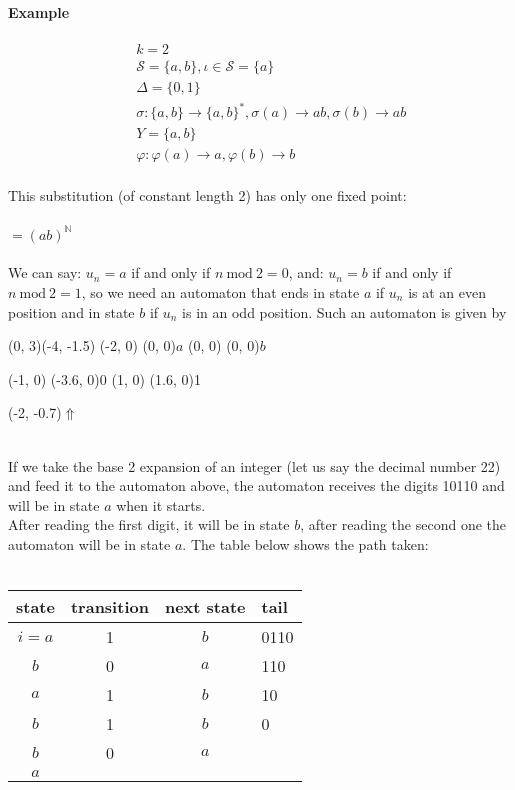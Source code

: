 \documentclass{article}
\begin{document}
\paragraph{Example}
\begin{eqnarray*}
&&k = 2\\
&&\mathcal{S} = \{a, b\}, \iota \in \mathcal{S} = \{a\}\\
&&\Delta = \{0, 1\}\\
&&\sigma:\{a, b\} \rightarrow \{a, b\}^*, \sigma(a) \rightarrow ab,
\sigma(b) \rightarrow ab\\
&&Y = \{a, b\}\\
&&\varphi: \varphi(a) \rightarrow a, \varphi(b) \rightarrow b
\end{eqnarray*}
\\
This substitution (of constant length 2) has only one fixed point:\\
\\
$= (ab)^\mathbb{N}$\\
\\
We can say: $u_n = a$ if and only if $n \mathrm{\ mod\ } 2 = 0$, and:
$u_n = b$ if and only if $n \mathrm{\ mod\ } 2 = 1$, so we need an automaton
that ends in state $a$ if $u_n$ is at an even position and in state $b$ if
$u_n$ is in an odd position. Such an automaton is given by\\
\begin{graph}(0, 3)(-4, -1.5)
  (-2, 0) (0, 0){$a$}
  (0, 0)  (0, 0){$b$}

  (-1, 0) \freetext(-3.6, 0){0}
   
   
  (1, 0) \freetext(1.6, 0){1}

  \freetext(-2, -0.7){$\Uparrow$}
\end{graph}\\
If we take the base 2 expansion of an integer (let us say the decimal
number 22) and feed it to the automaton above, the automaton receives the
digits 10110 and will be in state $a$ when it starts.\\
After reading the first digit, it will be in state $b$, after reading the
second one the automaton will be in state $a$. The table below shows the path
taken:\\
\\
\begin{tabular}{c|c|c|l}
state & transition & next state & tail\\
\hline
$i=a$ & 1 & $b$ & 0110\\
$b$   & 0 & $a$ & 110\\
$a$   & 1 & $b$ & 10\\
$b$   & 1 & $b$ & 0\\
$b$   & 0 & $a$ &\\
$a$   &   &   &
\end{tabular}\\
\end{document}
